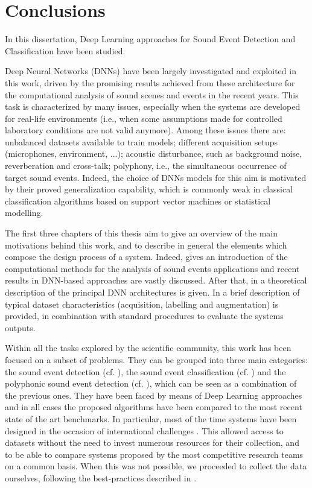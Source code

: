 \chapter{Conclusions}

In this dissertation, Deep Learning approaches for Sound Event Detection and Classification have been studied. 

Deep Neural Networks (DNNs) have been largely investigated
and exploited in this work, driven by the promising results achieved from these architecture for the computational analysis of sound scenes and events in the recent years. This task is characterized by many issues, especially when the systems are developed for real-life environments (i.e., when some assumptions made for controlled laboratory conditions are not valid anymore). Among these issues there are: unbalanced datasets available to train models; different acquisition setups (microphones, environment, ...); acoustic disturbance, such as background noise, reverberation and cross-talk; polyphony, i.e., the simultaneous occurrence of target sound events.
Indeed, the choice of DNNs models for this aim
is motivated by their proved generalization capability, which is commonly weak in
classical classification algorithms based on support vector machines or statistical modelling.

The first three chapters of this thesis aim to give an overview of the main
motivations behind this work, and to describe in general the elements which compose the design process of a system. Indeed,  gives an introduction of the computational methods for the analysis of sound events applications and recent results in DNN-based approaches are vastly discussed. After that, in  a theoretical description of the principal DNN architectures is given. In  a brief description of typical dataset characteristics (acquisition, labelling and augmentation) is provided, in combination with standard procedures to evaluate the systems outputs.

Within all the tasks explored by the scientific community, this work has been focused on a subset of problems. They can be grouped into three main categories: the sound event detection (cf. ), the sound event classification (cf. ) and the polyphonic sound event detection (cf. ), which can be seen as a combination of the previous ones.
They have been faced by means of Deep Learning approaches and in all cases the proposed algorithms have been compared to the most recent state of the art benchmarks. In particular, most of the time systems have been designed in the occasion of international challenges \cite{mesaros2016tut,DCASE2017challenge,ComParE2017,stowell2018automatic}. This allowed access to datasets without the need to invest numerous resources for their collection, and to be able to compare systems proposed by the most competitive research teams on a common basis. When this was not possible, we proceeded to collect the data ourselves, following the best-practices described in .


